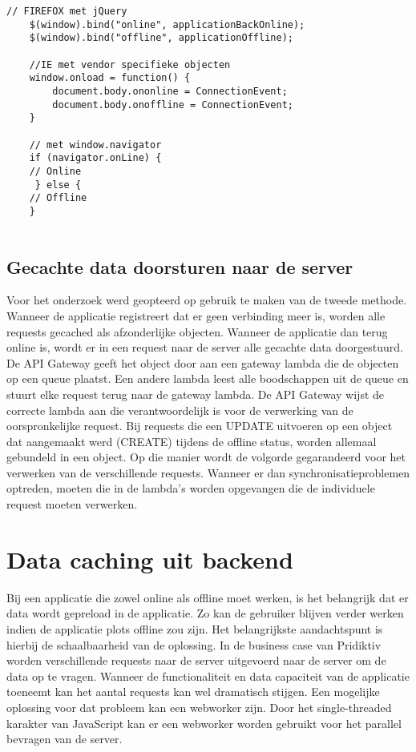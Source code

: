 \begin{lstlisting}[caption=DOM API's voor controleren offline en online status]
    // FIREFOX met jQuery
    $(window).bind("online", applicationBackOnline); 
    $(window).bind("offline", applicationOffline);

    //IE met vendor specifieke objecten
    window.onload = function() {
        document.body.ononline = ConnectionEvent;
        document.body.onoffline = ConnectionEvent;
    }
    
    // met window.navigator
    if (navigator.onLine) {
  	// Online
     } else {
  	// Offline
	}
    
\end{lstlisting}

\subsection{Gecachte data doorsturen naar de server}
Voor het onderzoek werd geopteerd op gebruik te maken van de tweede methode. Wanneer de applicatie registreert dat er geen verbinding meer is, worden alle requests gecached als afzonderlijke objecten. Wanneer de applicatie dan terug online is, wordt er in een request naar de server alle gecachte data doorgestuurd. De API Gateway geeft het object door aan een gateway lambda die de objecten op een queue plaatst.  Een andere lambda leest alle boodschappen uit de queue en stuurt elke request terug naar de gateway lambda. De API Gateway wijst de correcte lambda aan die verantwoordelijk is voor de verwerking van de oorspronkelijke request. Bij requests die een UPDATE uitvoeren op een object dat aangemaakt werd (CREATE) tijdens de offline status, worden allemaal gebundeld in een object. Op die manier wordt de volgorde gegarandeerd voor het verwerken van de verschillende requests. Wanneer er dan synchronisatieproblemen optreden, moeten die in de lambda's worden opgevangen die de individuele request moeten verwerken.

\section{Data caching uit backend}
Bij een applicatie die zowel online als offline moet werken, is het belangrijk dat er data wordt gepreload in de applicatie. Zo kan de gebruiker blijven verder werken indien de applicatie plots offline zou zijn. Het belangrijkste aandachtspunt is hierbij de schaalbaarheid van de oplossing. In de business case van Pridiktiv worden verschillende requests naar de server uitgevoerd naar de server om de data op te vragen. Wanneer de functionaliteit en data capaciteit van de applicatie toeneemt kan het aantal requests kan wel dramatisch stijgen. Een mogelijke oplossing voor dat probleem kan een webworker zijn. Door het single-threaded karakter van JavaScript kan er een webworker worden gebruikt voor het parallel bevragen van de server.

